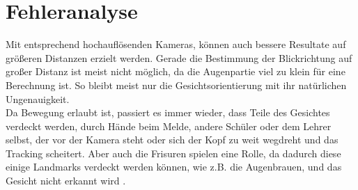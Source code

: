 \section{Fehleranalyse}
Mit entsprechend hochauflösenden Kameras, können auch bessere Resultate auf größeren Distanzen erzielt werden. Gerade die Bestimmung der Blickrichtung auf großer Distanz ist meist nicht möglich, da die Augenpartie viel zu klein für eine Berechnung ist. So bleibt meist nur die Gesichtsorientierung mit ihr natürlichen Ungenauigkeit.\\
Da Bewegung erlaubt ist, passiert es immer wieder, dass Teile des Gesichtes verdeckt werden, durch Hände beim Melde, andere Schüler oder dem Lehrer selbst, der vor der Kamera steht oder sich der Kopf zu weit wegdreht und das Tracking scheitert. Aber auch die Frisuren spielen eine Rolle, da dadurch diese einige Landmarks verdeckt werden können, wie z.B. die Augenbrauen, und das Gesicht nicht erkannt wird .